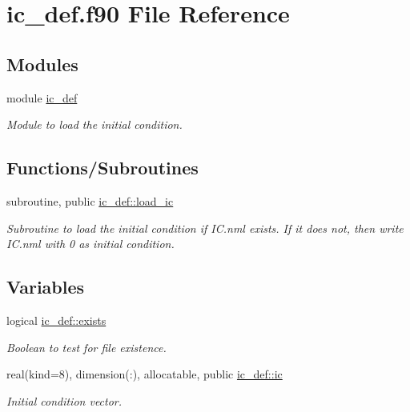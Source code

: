 \hypertarget{ic__def_8f90}{}\section{ic\+\_\+def.\+f90 File Reference}
\label{ic__def_8f90}
\subsection*{Modules}
\begin{DoxyCompactItemize}
\item 
module \hyperlink{namespaceic__def}{ic\+\_\+def}
\begin{DoxyCompactList}\small\item\em Module to load the initial condition. \end{DoxyCompactList}\end{DoxyCompactItemize}
\subsection*{Functions/\+Subroutines}
\begin{DoxyCompactItemize}
\item 
subroutine, public \hyperlink{namespaceic__def_af3d9de16d535e27cf3bacd7f82d68d54}{ic\+\_\+def\+::load\+\_\+ic}
\begin{DoxyCompactList}\small\item\em Subroutine to load the initial condition if I\+C.\+nml exists. If it does not, then write I\+C.\+nml with 0 as initial condition. \end{DoxyCompactList}\end{DoxyCompactItemize}
\subsection*{Variables}
\begin{DoxyCompactItemize}
\item 
logical \hyperlink{namespaceic__def_a989b031664e87b1a693a329ecd4f4721}{ic\+\_\+def\+::exists}
\begin{DoxyCompactList}\small\item\em Boolean to test for file existence. \end{DoxyCompactList}\item 
real(kind=8), dimension(\+:), allocatable, public \hyperlink{namespaceic__def_abef3b68b2ee81311ed2c796cba3a382f}{ic\+\_\+def\+::ic}
\begin{DoxyCompactList}\small\item\em Initial condition vector. \end{DoxyCompactList}\end{DoxyCompactItemize}
